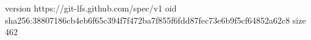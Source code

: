 version https://git-lfs.github.com/spec/v1
oid sha256:38807186cb4eb6f65c394f7f472ba7f855f6fdd87fec73e6b9f5cf64852a62c8
size 462
